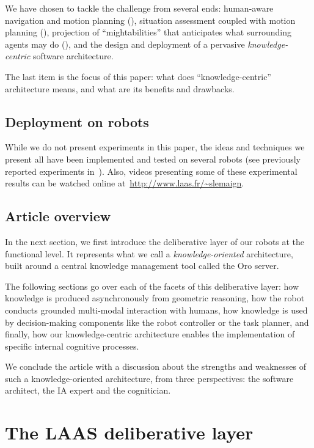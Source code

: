 \documentclass[letterpaper, 10 pt, conference]{ieeeconf}  %
\begin{document}
We have chosen to tackle the challenge from several ends: human-aware
navigation and motion planning (\cite{...Mamoun}), situation assessment coupled
with motion planning (\cite{...}), projection of ``mightabilities'' that
anticipates what surrounding agents may do (\cite{Amit...}), and the design and
deployment of a pervasive \emph{knowledge-centric} software architecture.

The last item is the focus of this paper: what does ``knowledge-centric''
architecture means, and what are its benefits and drawbacks.

\subsection{Deployment on robots}

While we do not present experiments in this paper, the ideas and techniques we
present all have been implemented and tested on several robots (see previously
reported experiments in~\cite{Lemaignan2010, Ros2010b, Lemaignan2011a,
Warnier2012a}). Also, videos presenting some of these experimental results can
be watched online at~\url{http://www.laas.fr/~slemaign}.

\subsection{Article overview}

In the next section, we first introduce the deliberative layer of our robots at
the functional level. It represents what we call a \emph{knowledge-oriented}
architecture, built around a central knowledge management tool called the {\sc
Oro} server.

The following sections go over each of the facets of this deliberative layer:
how knowledge is produced asynchronously from geometric reasoning, how the
robot conducts grounded multi-modal interaction with humans, how knowledge is
used by decision-making components like the robot controller or the task
planner, and finally, how our knowledge-centric architecture enables the
implementation of specific internal cognitive processes.

We conclude the article with a discussion about the strengths and weaknesses of
such a knowledge-oriented architecture, from three perspectives: the software
architect, the IA expert and the cognitician.


\section{The LAAS deliberative layer}
\end{document}
